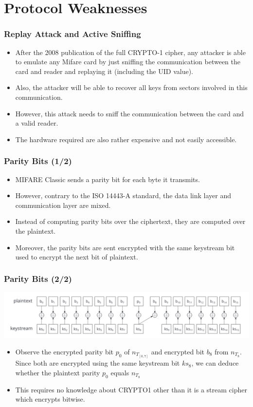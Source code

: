 \documentclass[12pt]{beamer}
\begin{document}
\section{Protocol Weaknesses}
\begin{frame}
\frametitle{Replay Attack and Active Sniffing}
\begin{itemize}
	\item After the 2008 publication of the full CRYPTO-1 cipher, any attacker is able to emulate any Mifare card by just sniffing the communication between the card and reader and replaying it (including the UID value).
	\item Also, the attacker will be able to recover all keys from sectors involved in this communication.
	\item However, this attack needs to sniff the communication between the card and a valid reader.
	\item The hardware required are also rather expensive and not easily accessible.
\end{itemize}
\end{frame}

\begin{frame}
\frametitle{Parity Bits (1/2)}
\begin{itemize}
  \item MIFARE Classic sends a parity bit for each byte it transmits.
  \item However, contrary to the ISO 14443-A standard, the data link layer and communication layer are mixed.
  \item Instead of computing parity bits over the ciphertext, they are computed over the plaintext.
  \item Moreover, the parity bits are sent encrypted with the same keystream bit used to encrypt the next bit of plaintext.
\end{itemize}
\end{frame}

\begin{frame}
\frametitle{Parity Bits (2/2)}
\begin{center}
  \includegraphics[width=\linewidth]{darkside}
\end{center}
\begin{itemize}
  \item Observe the encrypted parity bit $p_0$ of $n_{T_{[0, 7]}}$ and encrypted bit $b_8$ from $n_{T_8}$. Since both are encrypted using the same keystream bit $ks_8$, we can deduce whether the plaintext parity $p_0$ equals $n_{T_8}$
  \item This requires no knowledge about CRYPTO1 other than it is a stream cipher which encrypts bitwise.
\end{itemize}
\end{frame}
\end{document}
